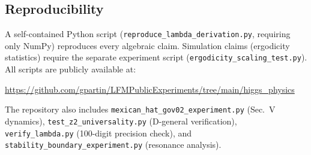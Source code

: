 \documentclass[12pt,a4paper]{article}
\begin{document}
\subsection*{Reproducibility}
A self-contained Python script (\texttt{reproduce\_lambda\_derivation.py}, requiring only NumPy) reproduces every algebraic claim. Simulation claims (ergodicity statistics) require the separate experiment script (\texttt{ergodicity\_scaling\_test.py}). All scripts are publicly available at:

\begin{center}
\url{https://github.com/gpartin/LFMPublicExperiments/tree/main/higgs_physics}
\end{center}

\noindent The repository also includes \texttt{mexican\_hat\_gov02\_experiment.py} (Sec.~V dynamics), \texttt{test\_z2\_universality.py} (D-general verification), \texttt{verify\_lambda.py} (100-digit precision check), and \texttt{stability\_boundary\_experiment.py} (resonance analysis).
\end{document}

